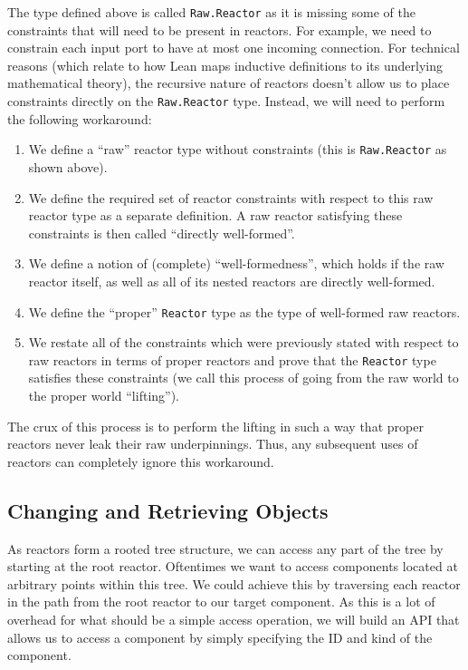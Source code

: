 The type defined above is called \lstinline{Raw.Reactor} as it is missing some of the constraints that will need to be present in reactors.
For example, we need to constrain each input port to have at most one incoming connection.
For technical reasons (which relate to how Lean maps inductive definitions to its underlying mathematical theory), the recursive nature of reactors doesn't allow us to place constraints directly on the \lstinline{Raw.Reactor} type.
Instead, we will need to perform the following workaround:

\begin{enumerate}
    \item We define a ``raw'' reactor type without constraints (this is \lstinline{Raw.Reactor} as shown above).
    \item We define the required set of reactor constraints with respect to this raw reactor type as a separate definition. A raw reactor satisfying these constraints is then called ``directly well-formed''.
    \item We define a notion of (complete) ``well-formedness'', which holds if the raw reactor itself, as well as all of its nested reactors are directly well-formed.
    \item We define the ``proper'' \lstinline{Reactor} type as the type of well-formed raw reactors.
    \item We restate all of the constraints which were previously stated with respect to raw reactors in terms of proper reactors and prove that the \lstinline{Reactor} type satisfies these constraints (we call this process of going from the raw world to the proper world ``lifting'').
\end{enumerate}

The crux of this process is to perform the lifting in such a way that proper reactors never leak their raw underpinnings.
Thus, any subsequent uses of reactors can completely ignore this workaround.

\subsection{Changing and Retrieving Objects}

As reactors form a rooted tree structure, we can access any part of the tree by starting at the root reactor.
Oftentimes we want to access components located at arbitrary points within this tree.
We could achieve this by traversing each reactor in the path from the root reactor to our target component. 
As this is a lot of overhead for what should be a simple access operation, we will build an API that allows us to access a component by simply specifying the ID and kind of the component.

